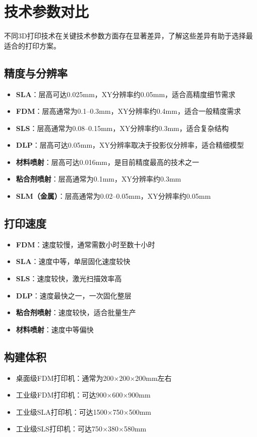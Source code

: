 \documentclass[12pt,UTF8]{ctexbook}
\begin{document}
\section{技术参数对比}

不同3D打印技术在关键技术参数方面存在显著差异，了解这些差异有助于选择最适合的打印方案。

\subsection{精度与分辨率}
\begin{itemize}
\item \textbf{SLA}：层高可达0.025mm，XY分辨率约0.05mm，适合高精度细节需求
\item \textbf{FDM}：层高通常为0.1--0.3mm，XY分辨率约0.4mm，适合一般精度需求
\item \textbf{SLS}：层高通常为0.08--0.15mm，XY分辨率约0.3mm，适合复杂结构
\item \textbf{DLP}：层高可达0.05mm，XY分辨率取决于投影仪分辨率，适合精细模型
\item \textbf{材料喷射}：层高可达0.016mm，是目前精度最高的技术之一
\item \textbf{粘合剂喷射}：层高通常为0.1mm，XY分辨率约0.3mm
\item \textbf{SLM（金属）}：层高通常为0.02--0.05mm，XY分辨率约0.05mm
\end{itemize}

\subsection{打印速度}
\begin{itemize}
\item \textbf{FDM}：速度较慢，通常需数小时至数十小时
\item \textbf{SLA}：速度中等，单层固化速度较快
\item \textbf{SLS}：速度较快，激光扫描效率高
\item \textbf{DLP}：速度最快之一，一次固化整层
\item \textbf{粘合剂喷射}：速度较快，适合批量生产
\item \textbf{材料喷射}：速度中等偏快
\end{itemize}

\subsection{构建体积}
\begin{itemize}
\item 桌面级FDM打印机：通常为200$\times$200$\times$200mm左右
\item 工业级FDM打印机：可达900$\times$600$\times$900mm
\item 工业级SLA打印机：可达1500$\times$750$\times$500mm
\item 工业级SLS打印机：可达750$\times$380$\times$580mm
\end{itemize}
\end{document}

